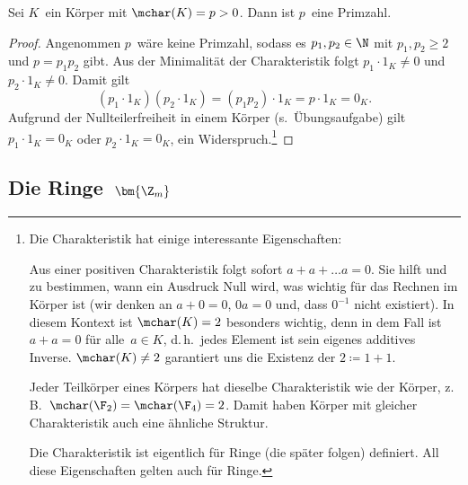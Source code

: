 \documentclass[a4paper]{article}
\begin{document}
\begin{lemma}\label{lem:primechar}
    Sei $K$~ein Körper mit $\mchar(K) = p > 0$. Dann ist $p$~eine Primzahl.
\end{lemma}

\begin{proof}
    Angenommen $p$~wäre keine Primzahl, sodass es $p_1, p_2 \in \N$ mit $p_1, p_2 \geq 2$ und $p = p_1p_2$ gibt. Aus der Minimalität der Charakteristik folgt $p_1 \cdot 1_K \neq 0$ und $p_2 \cdot 1_K \neq 0$. Damit gilt
    \begin{equation*}
        (p_1 \cdot 1_K) (p_2 \cdot 1_K) = (p_1p_2) \cdot 1_K = p \cdot 1_K = 0_K.
    \end{equation*}
    Aufgrund der Nullteilerfreiheit in einem Körper (s.~Übungsaufgabe) gilt $p_1 \cdot 1_K = 0_K$ oder $p_2 \cdot 1_K = 0_K$, ein Widerspruch.\footnote{Die Charakteristik hat einige interessante Eigenschaften:

    Aus einer positiven Charakteristik folgt sofort $a + a + \dots a = 0$. Sie hilft und zu bestimmen, wann ein Ausdruck Null wird, was wichtig für das Rechnen im Körper ist (wir denken an $a+0 = 0$, $0a = 0$ und, dass $0^{-1}$ nicht existiert). In diesem Kontext ist $\mchar(K) = 2$ besonders wichtig, denn in dem Fall ist $a + a = 0$ für alle~$a \in K$, d.\,h.\ jedes Element ist sein eigenes additives Inverse. $\mchar(K) \neq 2$ garantiert uns die Existenz der $2 \coloneqq 1+1$.
                
    Jeder Teilkörper eines Körpers hat dieselbe Charakteristik wie der Körper, z.\,B.\ $\mchar(\F_2) = \mchar(\F_4) = 2$. Damit haben Körper mit gleicher Charakteristik auch eine ähnliche Struktur.
                
    Die Charakteristik ist eigentlich für Ringe (die später folgen) definiert. All diese Eigenschaften gelten auch für Ringe.}
\end{proof}


\subsection{Die Ringe~\texorpdfstring{$\bm{\Z_m}$}{Zm}}
\end{document}
